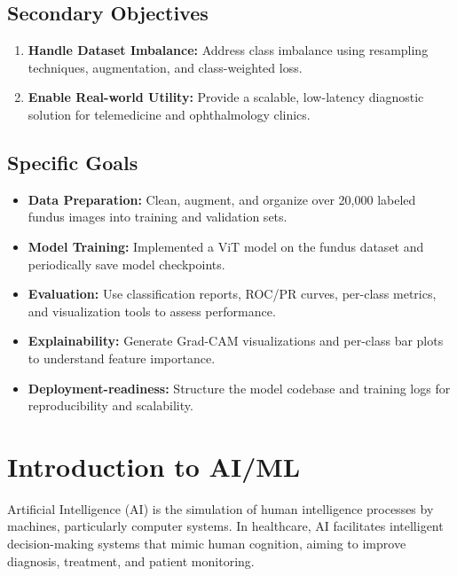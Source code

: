 \documentclass[a4paper,12pt]{report}
\begin{document}
\subsection{Secondary Objectives}
\begin{enumerate}
    \item \textbf{Handle Dataset Imbalance:} Address class imbalance using resampling techniques, augmentation, and class-weighted loss.
    \item \textbf{Enable Real-world Utility:} Provide a scalable, low-latency diagnostic solution for telemedicine and ophthalmology clinics.
\end{enumerate}

\subsection{Specific Goals}
\begin{itemize}
    \item \textbf{Data Preparation:} Clean, augment, and organize over 20,000 labeled fundus images into training and validation sets.
    \item \textbf{Model Training:} Implemented a ViT model on the fundus dataset and periodically save model checkpoints.
    \item \textbf{Evaluation:} Use classification reports, ROC/PR curves, per-class metrics, and visualization tools to assess performance.
    \item \textbf{Explainability:} Generate Grad-CAM visualizations and per-class bar plots to understand feature importance.
    \item \textbf{Deployment-readiness:} Structure the model codebase and training logs for reproducibility and scalability.
\end{itemize}

\section{Introduction to AI/ML}

Artificial Intelligence (AI) is the simulation of human intelligence processes by machines, particularly computer systems. In healthcare, AI facilitates intelligent decision-making systems that mimic human cognition, aiming to improve diagnosis, treatment, and patient monitoring.
\end{document}
